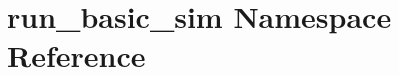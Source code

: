 \hypertarget{namespacerun__basic__sim}{\section{run\-\_\-basic\-\_\-sim Namespace Reference}
\label{namespacerun__basic__sim}
}
